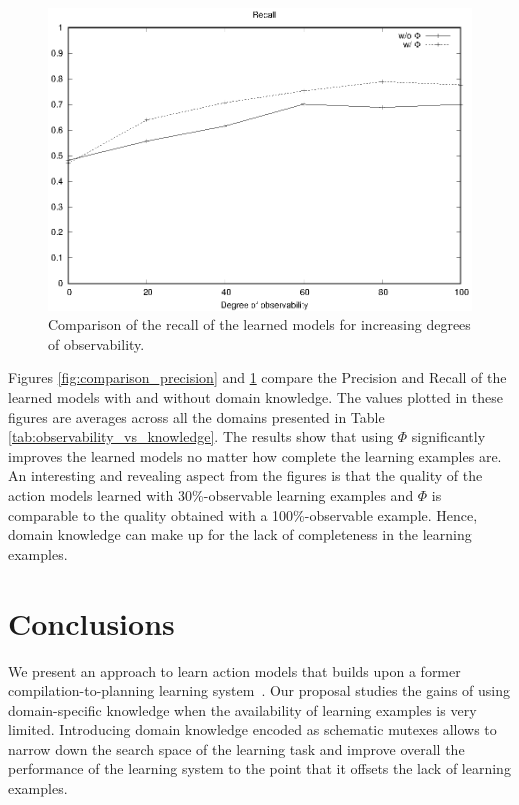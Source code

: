 \documentclass{article}
\begin{document}
\begin{figure}[hbt!]
	\centering
	\includegraphics[width=\linewidth]{figures/comparison_recall.eps}
	\caption{Comparison of the recall of the learned models for increasing degrees of observability.}
	\label{fig:comparison_recall}
\end{figure}

Figures \ref{fig:comparison_precision} and \ref{fig:comparison_recall} compare the Precision and Recall of the learned models with and without domain knowledge. The values plotted in these figures are averages across all the domains presented in Table \ref{tab:observability_vs_knowledge}. The results show that using $\Phi$ significantly improves the learned models no matter how complete the learning examples are. An interesting and revealing aspect from the figures is that the quality of the action models learned with 30\%-observable learning examples and $\Phi$ is comparable to the quality obtained with a 100\%-observable example. Hence, domain knowledge can make up for the lack of completeness in the learning examples.



\section{Conclusions}
\label{sec:conclusions}

We present an approach to learn action models that builds upon a former compilation-to-planning learning system~\cite{aineto2018learning}. Our proposal studies the gains of using domain-specific knowledge when the availability of learning examples is very limited. Introducing domain knowledge encoded as schematic mutexes allows to narrow down the search space of the learning task and improve overall the performance of the learning system to the point that it offsets the lack of learning examples.
\end{document}
